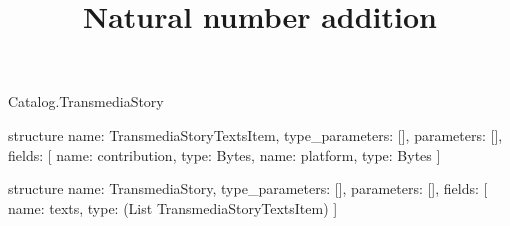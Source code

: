 \begin{lexlean}{Catalog.TransmediaStory}
\title{Natural number addition}
\begin{semanticmodule}
structure{
  name: TransmediaStoryTextsItem,
  type_parameters: [],
  parameters: [],
  fields: [
    {name: contribution, type: Bytes},
    {name: platform, type: Bytes}
  ]
}

structure{
  name: TransmediaStory,
  type_parameters: [],
  parameters: [],
  fields: [
    {name: texts, type: (List TransmediaStoryTextsItem)}
  ]
}
\end{semanticmodule}
\end{lexlean}
